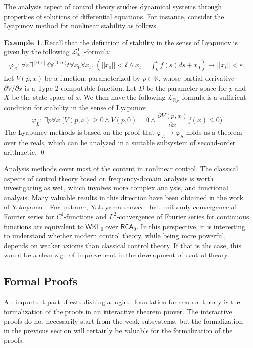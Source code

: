 \documentclass[11pt]{article}
\newcommand{\lrf}{\mathcal{L}_{\mathbb{R}_{\mathcal{F}}}}
\theoremstyle{definition}
\newtheorem{example}{Example}[section]
\begin{document}
The analysis aspect of control theory studies dynamical systems through properties of solutions of differential equations. For instance, consider the Lyapunov method for nonlinear stability as follows. 
\begin{example}
Recall that the definition of stability in the sense of Lyapunov is given by the following $\lrf^1$-formula:
\begin{eqnarray*}
\varphi_S:\ \forall\varepsilon\exists^{[0,\varepsilon]} \delta \forall^{[0,\infty)} t\forall x_0\forall x_t .\; (||x_0||<\delta \wedge x_t = \int_0^t f(s)ds + x_0 )\rightarrow ||x_t||<\varepsilon.
\end{eqnarray*}
Let $V(p,x)$ be a function, parameterized by $p\in \mathbb{R}$, whose partial derivative ${\partial V}/{\partial x}$ is a Type 2 computable function. Let $D$ be the parameter space for $p$ and $X$ be the state space of $x$. We then have the following $\lrf$-formula is a sufficient condition for stability in the sense of Lyapunov
$$\varphi_L:\ \exists p\forall x\; \bigg(V(p,x)\geq 0 \wedge V(p,0) = 0\wedge \frac{\partial V(p,x)}{\partial x}f(x)\leq 0\bigg)$$
The Lyapunov methods is based on the proof that $\varphi_L\rightarrow \varphi_S$ holds as a theorem over the reals, which can be analyzed in a suitable subsystem of second-order arithmetic. \qed
\end{example}
Analysis methods cover most of the content in nonlinear control. The classical aspects of control theory based on frequency-domain analysis is worth investigating as well, which involves more complex analysis, and functional analysis. Many valuable results in this direction have been obtained in the work of Yokoyama~\cite{yoko}. For instance, Yokoyama showed that uniformly convergence of Fourier series for $C^1$-functions and $L^2$-convergence of Fourier series for continuous functions are equivalent to $\mathsf{WKL}_0$ over $\mathsf{RCA}_0$. In this perspective, it is interesting to understand whether modern control theory, while being more powerful, depends on weaker axioms than classical control theory. If that is the case, this would be a clear sign of improvement in the development of control theory. 

\subsection{Formal Proofs}

An important part of establishing a logical foundation for control theory is the formalization of the proofs in an interactive theorem prover. The interactive proofs do not necessarily start from the weak subsystems, but the formalization in the previous section will certainly be valuable for the formalization of the proofs. 
\end{document}
